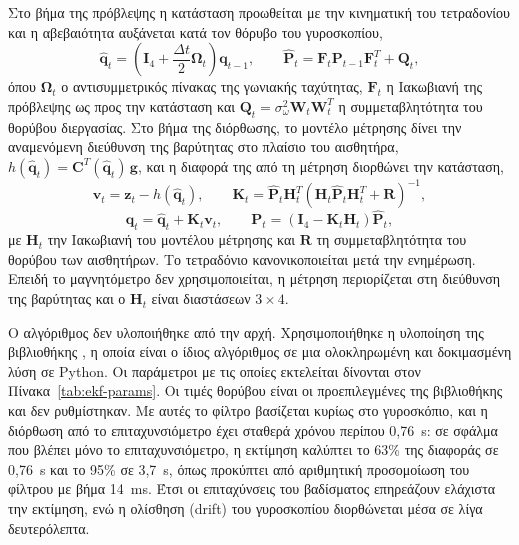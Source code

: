 \documentclass[11pt]{report}
\begin{document}
Στο βήμα της πρόβλεψης η κατάσταση προωθείται με την κινηματική του τετραδονίου
και η αβεβαιότητα αυξάνεται κατά τον θόρυβο του γυροσκοπίου,
\begin{equation}
\hat{\mathbf{q}}_t = \left(\mathbf{I}_4 + \frac{\Delta t}{2}
\boldsymbol{\Omega}_t\right)\mathbf{q}_{t-1}, \qquad
\hat{\mathbf{P}}_t = \mathbf{F}_t \mathbf{P}_{t-1} \mathbf{F}_t^{T} +
\mathbf{Q}_t,
\label{eq:ekf-predict}
\end{equation}
όπου $\boldsymbol{\Omega}_t$ ο αντισυμμετρικός πίνακας της γωνιακής ταχύτητας,
$\mathbf{F}_t$ η Ιακωβιανή της πρόβλεψης ως προς την κατάσταση και
$\mathbf{Q}_t = \sigma_\omega^2 \mathbf{W}_t \mathbf{W}_t^{T}$ η συμμεταβλητότητα
του θορύβου διεργασίας. Στο βήμα της διόρθωσης, το μοντέλο μέτρησης δίνει την
αναμενόμενη διεύθυνση της βαρύτητας στο πλαίσιο του αισθητήρα,
$h(\hat{\mathbf{q}}_t) = \mathbf{C}^{T}(\hat{\mathbf{q}}_t)\,\mathbf{g}$, και η
διαφορά της από τη μέτρηση διορθώνει την κατάσταση,
\begin{equation}
\mathbf{v}_t = \mathbf{z}_t - h(\hat{\mathbf{q}}_t), \qquad
\mathbf{K}_t = \hat{\mathbf{P}}_t \mathbf{H}_t^{T}
\left(\mathbf{H}_t \hat{\mathbf{P}}_t \mathbf{H}_t^{T} + \mathbf{R}\right)^{-1},
\label{eq:ekf-gain}
\end{equation}
\begin{equation}
\mathbf{q}_t = \hat{\mathbf{q}}_t + \mathbf{K}_t \mathbf{v}_t, \qquad
\mathbf{P}_t = \left(\mathbf{I}_4 - \mathbf{K}_t \mathbf{H}_t\right)
\hat{\mathbf{P}}_t,
\label{eq:ekf-update}
\end{equation}
με $\mathbf{H}_t$ την Ιακωβιανή του μοντέλου μέτρησης και $\mathbf{R}$ τη
συμμεταβλητότητα του θορύβου των αισθητήρων. Το τετραδόνιο κανονικοποιείται μετά
την ενημέρωση. Επειδή το μαγνητόμετρο δεν χρησιμοποιείται, η μέτρηση περιορίζεται
στη διεύθυνση της βαρύτητας και ο $\mathbf{H}_t$ είναι διαστάσεων $3 \times 4$.

Ο αλγόριθμος δεν υλοποιήθηκε από την αρχή. Χρησιμοποιήθηκε η υλοποίηση της
βιβλιοθήκης \cite{garcia_ahrs}, η οποία είναι ο ίδιος αλγόριθμος σε μια
ολοκληρωμένη και δοκιμασμένη λύση σε Python. Οι παράμετροι με τις οποίες
εκτελείται δίνονται στον Πίνακα~\ref{tab:ekf-params}. Οι τιμές θορύβου είναι οι
προεπιλεγμένες της βιβλιοθήκης και δεν ρυθμίστηκαν. Με αυτές το φίλτρο βασίζεται
κυρίως στο γυροσκόπιο, και η διόρθωση από το επιταχυνσιόμετρο έχει σταθερά
χρόνου περίπου 0,76~s: σε σφάλμα που βλέπει μόνο το επιταχυνσιόμετρο, η εκτίμηση
καλύπτει το 63\% της διαφοράς σε 0,76~s και το 95\% σε 3,7~s, όπως προκύπτει
από αριθμητική προσομοίωση του φίλτρου με βήμα 14~ms. Έτσι οι επιταχύνσεις του
βαδίσματος επηρεάζουν ελάχιστα την εκτίμηση, ενώ η ολίσθηση (drift) του
γυροσκοπίου διορθώνεται μέσα σε λίγα δευτερόλεπτα.
\end{document}
